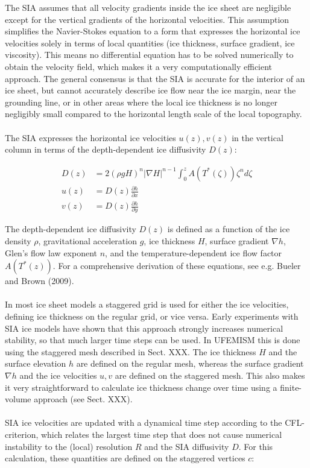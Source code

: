 \documentclass{article}
\begin{document}
The SIA assumes that all velocity gradients inside the ice sheet are negligible except for the vertical gradients of the horizontal velocities. This assumption simplifies the Navier-Stokes equation to a form that expresses the horizontal ice velocities solely in terms of local quantities (ice thickness, surface gradient, ice viscosity). This means no differential equation has to be solved numerically to obtain the velocity field, which makes it a very computationally efficient approach. The general consensus is that the SIA is accurate for the interior of an ice sheet, but cannot accurately describe ice flow near the ice margin, near the grounding line, or in other areas where the local ice thickness is no longer negligibly small compared to the horizontal length scale of the local topography.\\
\\
The SIA expresses the horizontal ice velocities $u(z),v(z)$ in the vertical column in terms of the depth-dependent ice diffusivity $D(z)$:

\begin{align} \label{eq:SIA}
D(z) &= 2 {(\rho g H)}^n {\left| \nabla H \right| }^{n-1} \int_0^z A\left( T^{\ast}(\zeta)\right) \zeta^n d\zeta \\
u(z) &= D(z) \frac{\partial h}{\partial x} \\
v(z) &= D(z) \frac{\partial h}{\partial y}
\end{align}

The depth-dependent ice diffusivity $D(z)$ is defined as a function of the ice density $\rho$, gravitational acceleration $g$, ice thickness $H$, surface gradient $\nabla h$, Glen's flow law exponent $n$, and the temperature-dependent ice flow factor $A\left( T^{\ast}(z) \right)$. For a comprehensive derivation of these equations, see e.g. Bueler and Brown (2009).\\
\\
In most ice sheet models a staggered grid is used for either the ice velocities, defining ice thickness on the regular grid, or vice versa. Early experiments with SIA ice models have shown that this approach strongly increases numerical stability, so that much larger time steps can be used. In UFEMISM this is done using the staggered mesh described in Sect. XXX. The ice thickness $H$ and the surface elevation $h$ are defined on the regular mesh, whereas the surface gradient $\nabla h$ and the ice velocities $u,v$ are defined on the staggered mesh. This also makes it very straightforward to calculate ice thickness change over time using a finite-volume approach (see Sect. XXX).\\
\\
SIA ice velocities are updated with a dynamical time step according to the CFL-criterion, which relates the largest time step that does not cause numerical instability to the (local) resolution $R$ and the SIA diffusivity $D$. For this calculation, these quantities are defined on the staggered vertices $c$:
\end{document}
